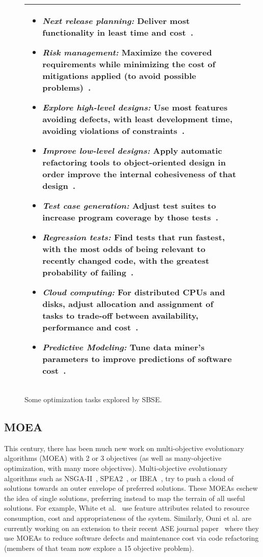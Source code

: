 \documentclass[10pt,journal,compsoc]{IEEEtran}
\newcommand{\bi}{\begin{itemize}}
\newcommand{\ei}{\end{itemize}}
\begin{document}
\begin{figure}[!t]
\small
\begin{tabular}{|p{3.1in}|}\hline
\bi
\item
{\em  Next release planning:}
Deliver most functionality
in least time and cost~\cite{zhang07a,bagnall01,DurilloZAHN11}.
\item {\em Risk management:} Maximize the covered requirements while minimizing the
cost of  mitigations applied  (to avoid possible problems)~\cite{fea02a,feather03,me08b}.
\item {\em Explore high-level designs:} Use most features
avoiding defects, with  least development time,  avoiding violations of
constraints~\cite{sayyad13a,sayyad13b}.
\item {\em Improve low-level designs:}
Apply automatic refactoring tools to object-oriented design in order improve the internal
cohesiveness of that design~\cite{ocinneide12}.
\item
{\em  Test case generation:} Adjust  test suites
to increase program  coverage by those tests~\cite{andrews07,andrews10,me09m}.
\item
{\em Regression tests:} Find tests that run fastest, with the most odds of being relevant
to  recently changed code, with the greatest probability of failing~\cite{weimer13}.
\item
{\em Cloud computing:}
For distributed CPUs and disks, adjust allocation and assignment of tasks
to  trade-off between availability,
performance and cost~\cite{harman13}.
\item
{\em Predictive Modeling:} Tune  data miner's parameters to improve  predictions of
software cost~\cite{cora10}.
\ei\\\hline
\end{tabular}
\caption{Some optimization tasks explored by SBSE.}\label{fig:tasks}
\end{figure}

\subsection{MOEA}

This century, there has been much new work on
multi-objective evolutionary algorithms (MOEA) with 2 or 3 objectives
(as
well as many-objective optimization, with many more
objectives).  Multi-objective evolutionary algorithms
such as NSGA-II~\cite{deb00afast},
SPEA2~\cite{zit02}, or IBEA~\cite{Zitzler04indicator-basedselection}, try to push
a cloud of solutions towards an outer envelope of
preferred solutions.
These MOEAs eschew the idea of
single solutions, preferring instead to map the
terrain of all useful solutions.  For example, White
et al.~\cite{white09} use feature attributes related
to resource consumption, cost and appropriateness of
the system. Similarly, Ouni et al. are currently
working on an extension to their recent ASE journal
paper~\cite{ouni13} where they use MOEAs
 to reduce software defects and maintenance cost
via code refactoring (members of that team now explore a
15 objective problem).
\end{document}
